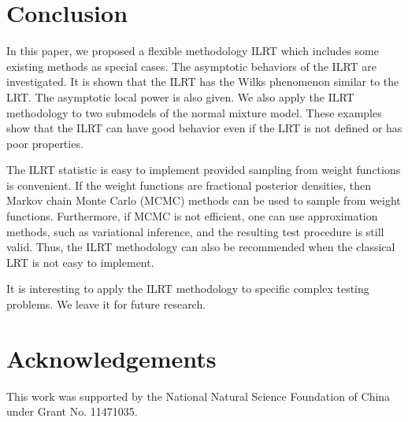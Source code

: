 \documentclass[11pt]{article}
\theoremstyle{plain}
\theoremstyle{definition}
\theoremstyle{remark}
\begin{document}
\section{Conclusion}
In this paper, we proposed a flexible methodology ILRT which includes some existing methods as special cases.
The asymptotic behaviors of the ILRT are investigated.
It is shown that the ILRT has the Wilks phenomenon similar to the LRT.
The asymptotic local power is also given.
We also apply the ILRT methodology to two submodels of the normal mixture model.
These examples show that the ILRT can have good behavior even if the LRT is not defined or has poor properties.


The ILRT statistic is easy to implement provided sampling from weight functions is convenient.
If the weight functions are fractional posterior densities, then Markov chain Monte Carlo (MCMC) methods can be used to sample from weight functions.
Furthermore, if MCMC is not efficient, one can use approximation methods, such as variational inference, and the resulting test procedure is still valid.
Thus, the ILRT methodology can also be recommended when the classical LRT is not easy to implement.

It is interesting to apply the ILRT methodology to specific complex testing problems.
We leave it for future research.

\section*{Acknowledgements}
This work was supported by the National Natural Science Foundation of China under Grant No. 11471035.
\end{document}
